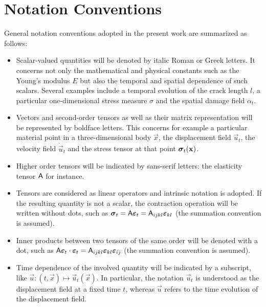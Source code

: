 \section*{Notation Conventions}
General notation conventions adopted in the present work are summarized as follows:
\begin{itemize}
\item Scalar-valued quantities will be denoted by italic Roman or Greek letters. It concerns not only the mathematical and physical constants such as the Young's modulus $E$ but also the temporal and spatial dependence of such scalars. Several examples include a temporal evolution of the crack length $l$, a particular one-dimensional stress measure $\sigma$ and the spatial damage field $\alpha_t$.

\item Vectors and second-order tensors as well as their matrix representation will be represented by boldface letters. This concerns for example a particular material point in a three-dimensional body $\vec{x}$, the displacement field $\vec{u}_t$, the velocity field $\dot{\vec{u}}_t$ and the stress tensor at that point $\sig_t(\vec{x})$.

\item Higher order tensors will be indicated by sans-serif letters: the elasticity tensor $\mathsf{A}$ for instance.

\item Tensors are considered as linear operators and intrinsic notation is adopted. If the resulting quantity is not a scalar, the contraction operation will be written without dots, such as $\sig_t=\tens{A}\eps_t=\tens{A}_{ijkl}\eps_{kl}$ (the summation
convention is assumed).

\item Inner products between two tensors of the same order will be denoted with a dot, such as $\tens{A}\eps_t\cdot\eps_t=\tens{A}_{ijkl}\eps_{kl}\eps_{ij}$ (the summation
convention is assumed).

\item Time dependence of the involved quantity will be indicated by a subscript, like $\vec{u}:(t,\vec{x})\mapsto\vec{u}_t(\vec{x})$. In particular, the notation $\vec{u}_t$ is understood as the displacement field at a fixed time $t$, whereas $\vec{u}$ refers to the time evolution of the displacement field.
\end{itemize}

